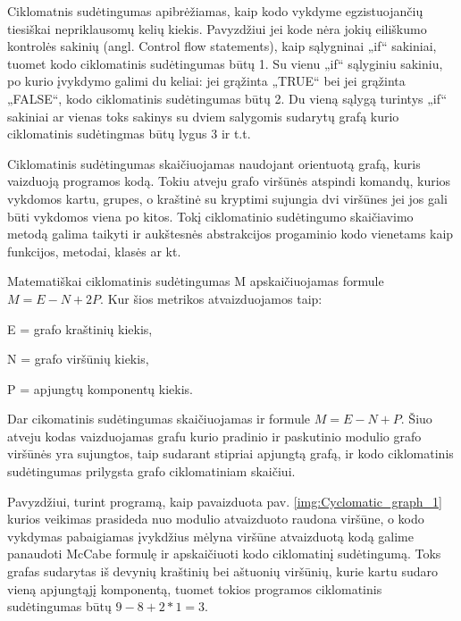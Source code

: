 \documentclass{VUMIFPSbakalaurinis}
\begin{document}
Ciklomatnis sudėtingumas apibrėžiamas, kaip kodo vykdyme egzistuojančių tiesiškai nepriklausomų kelių kiekis. Pavyzdžiui jei kode nėra jokių eiliškumo kontrolės sakinių (angl. Control flow statements), kaip sąlygninai „if“ sakiniai, tuomet kodo ciklomatinis sudėtingumas būtų 1. Su vienu „if“ sąlyginiu sakiniu, po kurio įvykdymo galimi du keliai: jei grąžinta „TRUE“ bei jei grąžinta „FALSE“, kodo ciklomatinis sudėtingumas būtų 2. Du vieną sąlygą turintys „if“ sakiniai ar vienas toks sakinys su dviem salygomis sudarytų grafą kurio ciklomatinis sudėtingmas būtų lygus 3 ir t.t. \cite{McCabe:1976:CM:800253.807712}

Ciklomatinis sudėtingumas skaičiuojamas naudojant orientuotą grafą, kuris vaizduoją programos kodą. Tokiu atveju grafo viršūnės atspindi komandų, kurios vykdomos kartu, grupes, o kraštinė su kryptimi sujungia dvi viršūnes jei jos gali būti vykdomos viena po kitos. Tokį ciklomatinio sudėtingumo skaičiavimo metodą galima taikyti ir aukštesnės abstrakcijos progaminio kodo vienetams kaip funkcijos, metodai, klasės ar kt.

Matematiškai ciklomatinis sudėtingumas M apskaičiuojamas formule \(M = E - N + 2P\). Kur šios metrikos atvaizduojamos taip:
\begin{description}  
\item E = grafo kraštinių kiekis,
\item N = grafo viršūnių kiekis,
\item P = apjungtų komponentų kiekis.
\end{description} 
Dar cikomatinis sudėtingumas skaičiuojamas ir formule \(M = E - N + P\). Šiuo atveju kodas vaizduojamas grafu kurio pradinio ir paskutinio modulio grafo viršūnės yra sujungtos, taip sudarant stipriai apjungtą grafą, ir kodo ciklomatinis sudėtingumas prilygsta grafo ciklomatiniam skaičiui.

Pavyzdžiui, turint programą, kaip pavaizduota pav. \ref{img:Cyclomatic_graph_1} kurios veikimas prasideda nuo modulio atvaizduoto raudona viršūne, o kodo vykdymas pabaigiamas įvykdžius mėlyna viršūne atvaizduotą kodą galime panaudoti McCabe formulę ir apskaičiuoti kodo ciklomatinį sudėtingumą. Toks grafas sudarytas iš devynių kraštinių bei aštuonių viršūnių, kurie kartu sudaro vieną apjungtąjį komponentą, tuomet tokios programos ciklomatinis sudėtingumas būtų \(9 - 8 + 2 * 1 = 3\).
\end{document}
